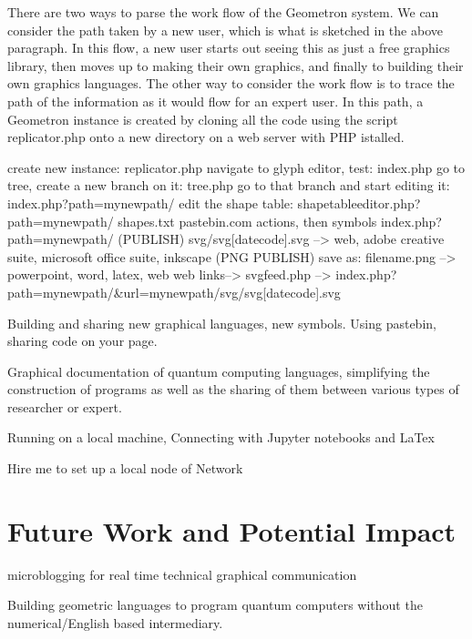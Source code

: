 \documentclass[11pt]{article}
\begin{document}
There are two ways to parse the work flow of the Geometron system.  We can consider the path taken by a new user, which is what is sketched in the above paragraph.  In this flow, a new user starts out seeing this as just a free graphics library, then moves up to making their own graphics, and finally to building their own graphics languages.  The other way to consider the work flow is to trace the path of the information as it would flow for an expert user.  In this path, a Geometron instance is created by cloning all the code using the script replicator.php onto a new directory on a web server with PHP istalled.  

create new instance:
replicator.php
navigate to glyph editor, test:
index.php
go to tree, create a new branch on it:
tree.php
go to that branch and start editing it:
index.php?path=mynewpath/
edit the shape table:
shapetableeditor.php?path=mynewpath/
shapes.txt
pastebin.com 
actions, then symbols
index.php?path=mynewpath/
(PUBLISH)
svg/svg[datecode].svg --> web, adobe creative suite, microsoft office suite, inkscape
(PNG PUBLISH)
save as: filename.png --> powerpoint, word, latex, web
web links--> svgfeed.php --> index.php?path=mynewpath/&url=mynewpath/svg/svg[datecode].svg






    Building and sharing new graphical languages, new symbols.  Using pastebin, sharing code on your page.




    Graphical documentation of quantum computing languages, simplifying the construction of programs as well as the sharing of them between various types of researcher or expert.




    Running on a local machine, Connecting with Jupyter notebooks and LaTex



Hire me to set up a local node of Network


\section{Future Work and Potential Impact}



    microblogging for real time technical graphical communication




    Building geometric languages to program quantum computers without the numerical/English based intermediary.
\end{document}
